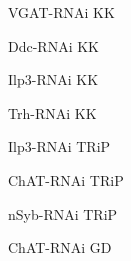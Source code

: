 \documentclass[17pt]{extarticle}
\begin{document}
\newpage{}
\vspace*{\fill}\begin{normalsize}
VGAT-RNAi KK \\[0.5em]
\end{normalsize}
\footnotesize
\vspace*{\fill}
\newpage{}
\vspace*{\fill}\begin{normalsize}
Ddc-RNAi KK \\[0.5em]
\end{normalsize}
\footnotesize
\vspace*{\fill}
\newpage{}
\vspace*{\fill}\begin{normalsize}
Ilp3-RNAi KK \\[0.5em]
\end{normalsize}
\footnotesize
\vspace*{\fill}
\newpage{}
\vspace*{\fill}\begin{normalsize}
Trh-RNAi KK \\[0.5em]
\end{normalsize}
\footnotesize
\vspace*{\fill}
\newpage{}
\vspace*{\fill}\begin{normalsize}
Ilp3-RNAi TRiP \\[0.5em]
\end{normalsize}
\footnotesize
\vspace*{\fill}
\newpage{}
\vspace*{\fill}\begin{normalsize}
ChAT-RNAi TRiP \\[0.5em]
\end{normalsize}
\footnotesize
\vspace*{\fill}
\newpage{}
\vspace*{\fill}\begin{normalsize}
nSyb-RNAi TRiP \\[0.5em]
\end{normalsize}
\footnotesize
\vspace*{\fill}
\newpage{}
\vspace*{\fill}\begin{normalsize}
ChAT-RNAi GD \\[0.5em]
\end{normalsize}
\footnotesize
\vspace*{\fill}
\newpage{}
\end{document}

